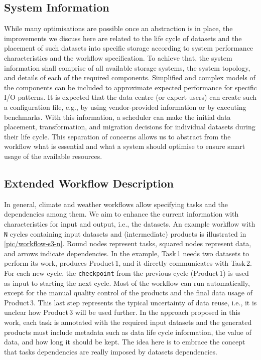 \documentclass{superfri}
\begin{document}
\subsection{System Information}

While many optimisations are possible once an abstraction is in place, the improvements we discuss here are related to the life cycle of datasets and the placement of such datasets into specific storage according to system performance characteristics and the workflow specification.
To achieve that, the system information shall comprise of all available storage systems, the system topology, and details of each of the required components.
Simplified and complex models of the components can be included to approximate expected performance for specific I/O patterns.
It is expected that the data centre (or expert users) can create such a configuration file, e.g., by using vendor-provided information or by executing benchmarks.
With this information, a scheduler can make the initial data placement, transformation, and migration decisions for individual datasets during their life cycle.
This separation of concerns allows us to abstract from the workflow what is essential and what a system should optimise to ensure smart usage of the available resources.

\subsection{Extended Workflow Description}

In general, climate and weather workflows allow specifying tasks and the dependencies among them.
We aim to enhance the current information with characteristics for input and output, i.e., the datasets.
An example workflow with \texttt{N} cycles containing input datasets and (intermediate) products is illustrated in \cref{pic/workflow-s3-n}.
Round nodes represent tasks, squared nodes represent data, and arrows indicate dependencies.
In the example, Task\,1 needs two datasets to perform its work, produces Product\,1, and it directly communicates with Task\,2.
For each new cycle, the \texttt{checkpoint} from the previous cycle (Product\,1) is used as input to starting the next cycle.
Most of the workflow can run automatically, except for the manual quality control of the products and the final data usage of Product\,3.
This last step represents the typical uncertainty of data reuse, i.e., it is unclear how Product\,3 will be used further.
In the approach proposed in this work, each task is annotated with the required input datasets and the generated products must include metadata such as data life cycle information, the value of data, and how long it should be kept.
The idea here is to embrace the concept that tasks dependencies are really imposed by datasets dependencies.
\end{document}
